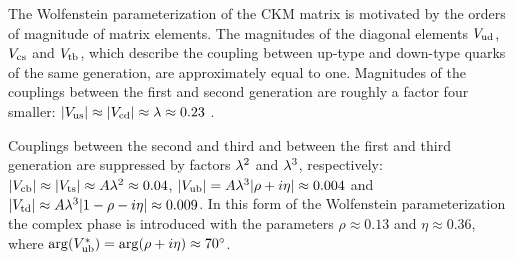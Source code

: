 The Wolfenstein parameterization of the CKM matrix is motivated by the orders of magnitude of matrix elements. The magnitudes of the
diagonal elements $V_\text{ud}$, $V_\text{cs}$ and $V_\text{tb}$, which describe the coupling between up-type and down-type quarks of the same generation, are
approximately equal to one. Magnitudes of the couplings between the first and second generation are roughly a factor four smaller:
$|V_\text{us}|\approx|V_\text{cd}|\approx\lambda\approx0.23$ \cite{Charles:2004jd,Bona:2005vz}.

Couplings between the second and third and between the first and third generation are suppressed by factors $\lambda^2$ and $\lambda^3$,
respectively: $|V_\text{cb}|\approx|V_\text{ts}|\approx A\lambda^2\approx0.04$, $|V_\text{ub}|=A\lambda^3|\rho+i\eta|\approx0.004$ and $|V_\text{td}|\approx
A\lambda^3|1-\rho-i\eta|\approx0.009$. In this form of the Wolfenstein parameterization the complex phase is introduced with the parameters
$\rho\approx0.13$ and $\eta\approx0.36$, where $\arg(V_\text{ub}^*)=\arg(\rho+i\eta)\approx70^\circ$.

